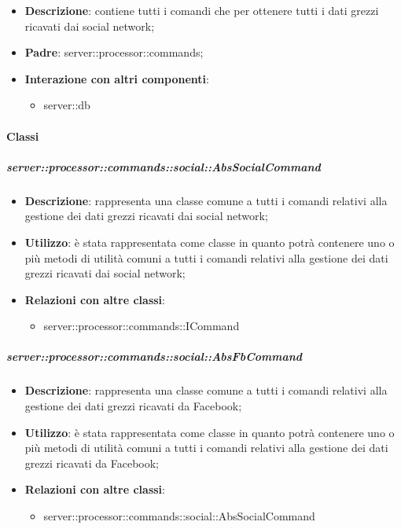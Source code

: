       \begin{itemize}
        \item \textbf{Descrizione}: contiene tutti i comandi che per ottenere tutti i dati grezzi ricavati dai social network;
        \item \textbf{Padre}: server::processor::commands;
        \item \textbf{Interazione con altri componenti}:
          \begin{itemize}
            \item server::db
          \end{itemize}
      \end{itemize}

        \paragraph{Classi} %

        \subparagraph{server::processor::commands::social::AbsSocialCommand} %
        \label{subp:bdsm_app_server_processor_commands_social_abssocialcommand}
        \begin{itemize}
          \item \textbf{Descrizione}: rappresenta una classe comune a tutti i comandi relativi alla gestione dei dati grezzi ricavati dai social network;
          \item \textbf{Utilizzo}: è stata rappresentata come classe in quanto potrà contenere uno o più metodi di utilità comuni a tutti i comandi relativi alla gestione dei dati grezzi ricavati dai social network;
          \item \textbf{Relazioni con altre classi}:
            \begin{itemize}
              \item server::processor::commands::ICommand
            \end{itemize}
        \end{itemize}


        \subparagraph{server::processor::commands::social::AbsFbCommand} %
        \label{subp:bdsm_app_server_processor_commands_social_absfbcommand}
        \begin{itemize}
          \item \textbf{Descrizione}: rappresenta una classe comune a tutti i comandi relativi alla gestione dei dati grezzi ricavati da Facebook;
          \item \textbf{Utilizzo}: è stata rappresentata come classe in quanto potrà contenere uno o più metodi di utilità comuni a tutti i comandi relativi alla gestione dei dati grezzi ricavati da Facebook;
          \item \textbf{Relazioni con altre classi}:
            \begin{itemize}
              \item server::processor::commands::social::AbsSocialCommand
            \end{itemize}
        \end{itemize}

